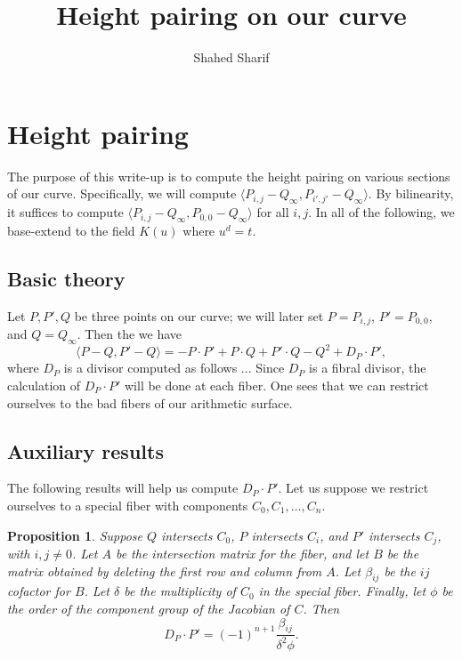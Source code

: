 \documentclass[pagesize,paper=letter]{scrartcl}
\newtheorem{proposition}[thm]{Proposition}
\theoremstyle{definition}
\theoremstyle{remark}
\begin{document}
\title{Height pairing on our curve}
\author{Shahed Sharif}

\section{Height pairing}
\label{sec:height-pairing}

The purpose of this write-up is to compute the height pairing on various sections of our curve. Specifically, we will compute $\langle P_{i,j} - Q_\infty, P_{i', j'} - Q_\infty \rangle$. By bilinearity, it suffices to compute $\langle P_{i,j} - Q_\infty, P_{0,0} - Q_\infty \rangle$ for all $i,j$. In all of the following, we base-extend to the field $K(u)$ where $u^d = t$.

\subsection{Basic theory}
\label{sec:basic-theory}

Let $P, P', Q$ be three points on our curve; we will later set $P = P_{i,j}$, $P' = P_{0,0}$, and $Q = Q_\infty$. Then the we have
\[
\langle P - Q, P' - Q\rangle = -P \cdot P' + P \cdot Q + P' \cdot Q - Q^2 + D_P \cdot P',
\]
 where $D_P$ is a divisor computed as follows ... Since $D_P$ is a fibral divisor, the calculation of $D_P \cdot P'$ will be done at each fiber. One sees that we can restrict ourselves to the bad fibers of our arithmetic surface.

\subsection{Auxiliary results}
\label{sec:auxiliary-results}

The following results will help us compute $D_P \cdot P'$. Let us suppose we restrict ourselves to a special fiber with components $C_0, C_1, \dots, C_n$.

\begin{proposition}\label{prop:dp-dot-p-cofactor}
  Suppose $Q$ intersects $C_0$, $P$ intersects $C_i$, and $P'$ intersects $C_j$, with $i,j \neq 0$. Let $A$ be the intersection matrix for the fiber, and let $B$ be the matrix obtained by deleting the first row and column from $A$. Let $\beta_{ij}$ be the $ij$ cofactor for $B$. Let $\delta$ be the multiplicity of $C_0$ in the special fiber. Finally, let $\phi$ be the order of the component group of the Jacobian of $C$. Then
  \[
  D_P \cdot P' = (-1)^{n+1} \frac{\beta_{ij}}{\delta^2 \phi}.
  \]
\end{proposition}
\end{document}
